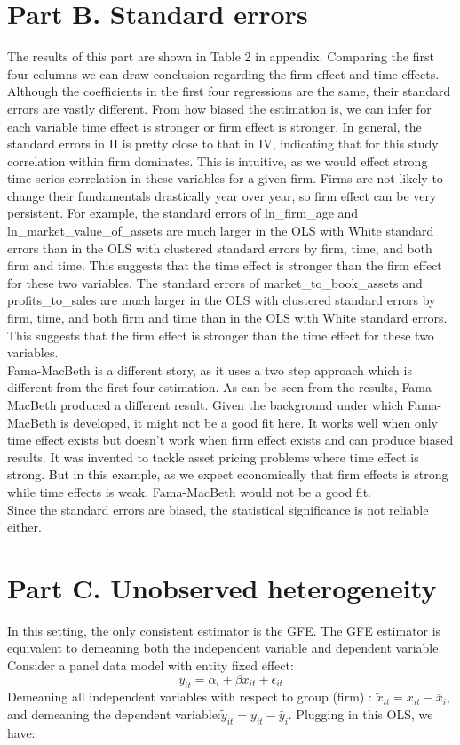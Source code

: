 \documentclass{article}
\begin{document}
\section*{Part B. Standard errors}
The results of this part are shown in Table 2 in appendix. Comparing the first four columns we can draw conclusion regarding the firm effect and time effects. Although the coefficients in the first four regressions are the same, their standard errors are vastly different. From how biased the estimation is, we can infer for each variable time effect is stronger or firm effect is stronger. In general, the standard errors in II is pretty close to that in IV, indicating that for this study correlation within firm dominates. This is intuitive, as we would effect strong time-series correlation in these variables for a given firm. Firms are not likely to change their fundamentals drastically year over year, so firm effect can be very persistent. For example, the standard errors of ln\_firm\_age and ln\_market\_value\_of\_assets are much larger in the OLS with White standard errors than in the OLS with clustered standard errors by firm, time, and both firm and time. This suggests that the time effect is stronger than the firm effect for these two variables. The standard errors of market\_to\_book\_assets and profits\_to\_sales are much larger in the OLS with clustered standard errors by firm, time, and both firm and time than in the OLS with White standard errors. This suggests that the firm effect is stronger than the time effect for these two variables. \\
Fama-MacBeth is a different story, as it uses a two step approach which is different from the first four estimation. As can be seen from the results, Fama-MacBeth produced a different result. Given the background under which Fama-MacBeth is developed, it might not be a good fit here. It works well when only time effect exists but doesn't work when firm effect exists and can produce biased results. It was invented to tackle asset pricing problems where time effect is strong. But in this example, as we expect economically that firm effects is strong while time effects is weak, Fama-MacBeth would not be a good fit. \\
Since the standard errors are biased, the statistical significance is not reliable either.

\section*{Part C. Unobserved heterogeneity}
In this setting, the only consistent estimator is the GFE. The GFE estimator is equivalent to demeaning both the independent variable and dependent variable. Consider a panel data model with entity fixed effect:
\begin{equation}
    y_{it} = \alpha_i + \beta x_{it} + \epsilon_{it}
\end{equation}
Demeaning all independent variables with respect to group (firm) : $\tilde{x}_{it} = x_{it} - \bar{x}_i$, and demeaning the dependent variable:$\tilde{y}_{it} = y_{it} - \bar{y}_i$. Plugging in this OLS, we have:
\end{document}
